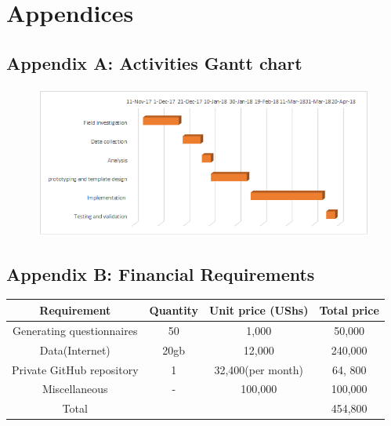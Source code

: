 \documentclass[12pt]{article}
\begin{document}
\newpage


\newpage
\section{Appendices}
\subsection{Appendix A: Activities Gantt chart}
\begin{figure}[h]
	\begin{center} \includegraphics[width=1\linewidth]{gantt.png} \end{center}
\end{figure}
\subsection{Appendix B: Financial Requirements}
\begin{tabular} {|c|c|c|c|}
	\hline
	Requirement & Quantity & Unit price (UShs) & Total price \\ \hline
	Generating questionnaires & 50 &  1,000 & 50,000 \\ \hline
	Data(Internet) & 20gb &  12,000 & 240,000 \\ \hline
	Private GitHub repository & 1 &  32,400(per month) & 64, 800\\ \hline
	Miscellaneous & -  & 100,000 & 100,000\\ \hline
	Total &  &  & 454,800\\ \hline
\end{tabular}
\end{document}
